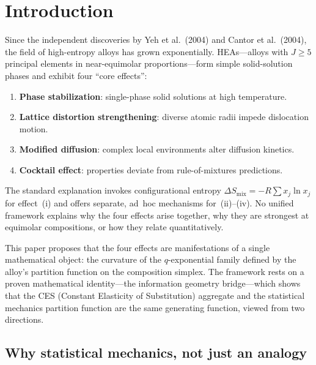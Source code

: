 \documentclass[12pt,letterpaper]{article}
\theoremstyle{definition}
\begin{document}
\tableofcontents

\section{Introduction}

Since the independent discoveries by Yeh et al.\ (2004) and Cantor et al.\ (2004), the field of high-entropy alloys has grown exponentially.  HEAs---alloys with $J \geq 5$ principal elements in near-equimolar proportions---form simple solid-solution phases and exhibit four ``core effects'':

\begin{enumerate}[label=(\roman*)]
  \item \textbf{Phase stabilization}: single-phase solid solutions at high temperature.
  \item \textbf{Lattice distortion strengthening}: diverse atomic radii impede dislocation motion.
  \item \textbf{Modified diffusion}: complex local environments alter diffusion kinetics.
  \item \textbf{Cocktail effect}: properties deviate from rule-of-mixtures predictions.
\end{enumerate}

The standard explanation invokes configurational entropy $\Delta S_{\mathrm{mix}} = -R\sum x_j \ln x_j$ for effect~(i) and offers separate, ad~hoc mechanisms for~(ii)--(iv).  No unified framework explains why the four effects arise together, why they are strongest at equimolar compositions, or how they relate quantitatively.

This paper proposes that the four effects are manifestations of a single mathematical object: the curvature of the $q$-exponential family defined by the alloy's partition function on the composition simplex.  The framework rests on a proven mathematical identity---the information geometry bridge---which shows that the CES (Constant Elasticity of Substitution) aggregate and the statistical mechanics partition function are the same generating function, viewed from two directions.

\subsection{Why statistical mechanics, not just an analogy}
\end{document}
